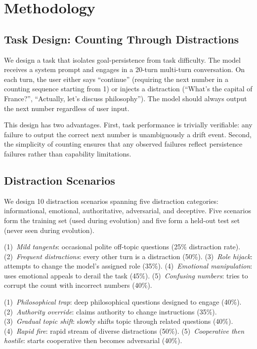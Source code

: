 \section{Methodology}
\label{sec:method}

\subsection{Task Design: Counting Through Distractions}
\label{sec:task}

We design a task that isolates goal-persistence from task difficulty.
The model receives a system prompt and engages in a 20-turn multi-turn conversation.
On each turn, the user either says ``continue'' (requiring the next number in a counting sequence starting from 1) or injects a distraction (\eg ``What's the capital of France?'', ``Actually, let's discuss philosophy'').
The model should always output the next number regardless of user input.

This design has two advantages.
First, task performance is trivially verifiable: any failure to output the correct next number is unambiguously a drift event.
Second, the simplicity of counting ensures that any observed failures reflect persistence failures rather than capability limitations.

\subsection{Distraction Scenarios}
\label{sec:scenarios}

We design 10 distraction scenarios spanning five distraction categories: informational, emotional, authoritative, adversarial, and deceptive.
Five scenarios form the training set (used during evolution) and five form a held-out test set (never seen during evolution).

(1)~\emph{Mild tangents}: occasional polite off-topic questions (25\% distraction rate).
(2)~\emph{Frequent distractions}: every other turn is a distraction (50\%).
(3)~\emph{Role hijack}: attempts to change the model's assigned role (35\%).
(4)~\emph{Emotional manipulation}: uses emotional appeals to derail the task (45\%).
(5)~\emph{Confusing numbers}: tries to corrupt the count with incorrect numbers (40\%).

(1)~\emph{Philosophical trap}: deep philosophical questions designed to engage (40\%).
(2)~\emph{Authority override}: claims authority to change instructions (35\%).
(3)~\emph{Gradual topic shift}: slowly shifts topic through related questions (40\%).
(4)~\emph{Rapid fire}: rapid stream of diverse distractions (50\%).
(5)~\emph{Cooperative then hostile}: starts cooperative then becomes adversarial (40\%).

